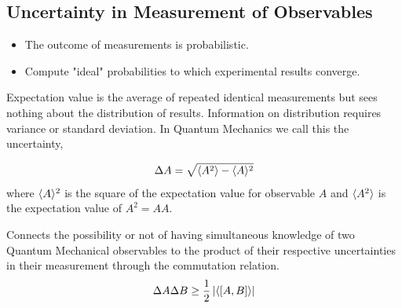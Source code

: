\documentclass[english, 11pt]{article}
\begin{document}
    \subsection{Uncertainty in Measurement of Observables}

      \begin{itemize}
        \item The outcome of measurements is probabilistic.
        \item Compute "ideal" probabilities to which experimental results converge.
      \end{itemize}

      Expectation value is the average of repeated identical measurements but sees nothing about the distribution of results. Information on distribution requires variance or standard deviation. In Quantum Mechanics we call this the uncertainty,

      \begin{defn}[uncertainty]\label{uncertainty}
      \[ \Delta A = \sqrt{\langle A^2 \rangle - \langle A \rangle^2} \]
      where $\langle A \rangle^2$ is the square of the expectation value for observable $A$ and $\langle A^2 \rangle$ is the expectation value of $A^2 = AA$.
      \end{defn}

      \begin{defn}\label{Uncertainty Principle}
        Connects the possibility or not of having simultaneous knowledge of two Quantum Mechanical observables to the product of their respective uncertainties in their measurement through the commutation relation.
        \[ \Delta A \Delta B \geq \frac{1}{2} \left| \langle [A,B] \rangle \right| \]
      \end{defn}
\end{document}
